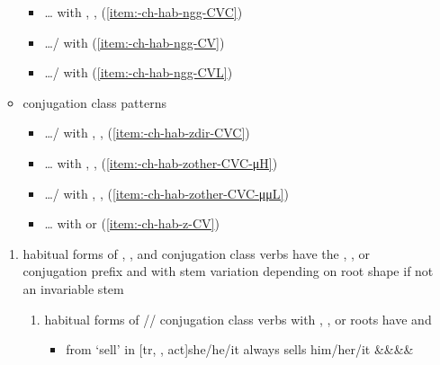 \begin{morphdesc}[resume*=alphalist]
\begin{enumerate}
\begin{itemize}
\begin{itemize}
				\item	{}…
					with , , 
					(\ref{item:-ch-hab-ng̱g-CVC})
				\item	{}…/
					with 
					(\ref{item:-ch-hab-ng̱g-CV})
				\item	{}…/
					with 
					(\ref{item:-ch-hab-ng̱g-CVL})
				\end{itemize}
			\item	{} conjugation class patterns
				\begin{itemize}
				\item	{}…/
					with , , 
					(\ref{item:-ch-hab-zdir-CVC})
				\item	{}…
					with , , 
					(\ref{item:-ch-hab-zother-CVC-μH})
				\item	{}…/
					with , , 
					(\ref{item:-ch-hab-zother-CVC-μμL})
				\item	{}…
					with  or 
					(\ref{item:-ch-hab-z-CV})
				\end{itemize}
			\end{itemize}
		\begin{enumerate}
		\item	\label{item:-ch-hab-ng̱g}
			habitual forms of , , and  conjugation class verbs
			have the , , or  conjugation prefix
			and 
			with stem variation depending on root shape
			if not an invariable stem
			\begin{enumerate}
			\item	\label{item:-ch-hab-ng̱g-CVC}
				habitual forms of // conjugation class verbs
				with , , or  roots
				have 
				and 
				\begin{itemize}
				\item	{}
					from  ‘sell’ in
					\newline
					[tr, ,  act]{she/he/it always sells him/her/it}
							{&&&\·\xx{var}&\·}

\end{itemize}
\end{enumerate}
\end{enumerate}
\end{enumerate}
\end{morphdesc}
